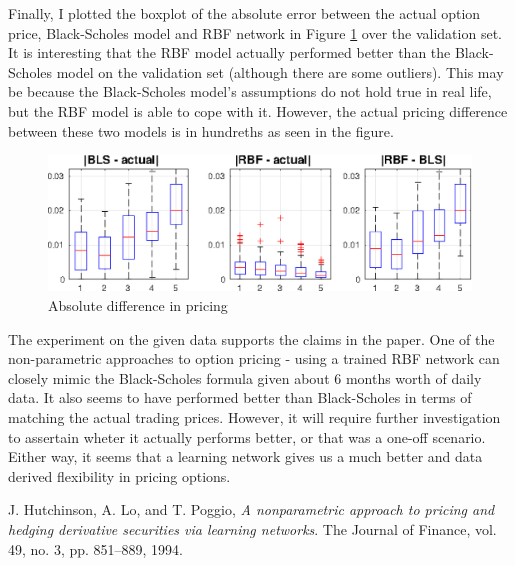 \documentclass[11pt, fleqn]{article}
\begin{document}
Finally, I plotted the boxplot of the absolute error between the actual option price, Black-Scholes model and RBF network in Figure \ref{fig:q1-bls-vs-rbf} over the validation set. It is interesting that the RBF model actually performed better than the Black-Scholes model on the validation set (although there are some outliers). This may be because the Black-Scholes model's assumptions do not hold true in real life, but the RBF model is able to cope with it. However, the actual pricing difference between these two models is in hundreths as seen in the figure.

\begin{figure}[!h]
\begin{center}
	\includegraphics[scale=.65] {q1_bls_vs_rbf.eps}
	\caption{Absolute difference in pricing}
	\label{fig:q1-bls-vs-rbf}
\end{center}
\end{figure}

The experiment on the given data supports the claims in the paper. One of the non-parametric approaches to option pricing - using a trained RBF network can closely mimic the Black-Scholes formula given about 6 months worth of daily data. It also seems to have performed better than Black-Scholes in terms of matching the actual trading prices. However, it will require further investigation to assertain wheter it actually performs better, or that was a one-off scenario. Either way, it seems that a learning network gives us a much better and data derived flexibility in pricing options.

\begin{thebibliography}{9}
J. Hutchinson, A. Lo, and T. Poggio,
\textit{A nonparametric  approach  to  pricing  and  hedging  derivative
securities via learning networks}. 
The Journal of Finance, vol. 49, no. 3, pp. 851–889, 1994.

\end{thebibliography}
\end{document}
